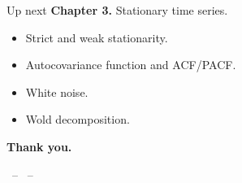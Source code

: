 \documentclass[aspectratio=169]{beamer}
\begin{document}
\begin{frame}{Up next}
  \textbf{Chapter 3.} Stationary time series.
  \medskip
  \begin{itemize}
    \item Strict and weak stationarity.
    \item Autocovariance function and ACF/PACF.
    \item White noise.
    \item Wold decomposition.
  \end{itemize}
  \medskip
  \begin{center}\Large\bfseries Thank you.\end{center}
  \begin{center}\footnotesize\auteurNom\ -- \auteurEmail\ -- \auteurInstitution\end{center}
\end{frame}
\end{document}
